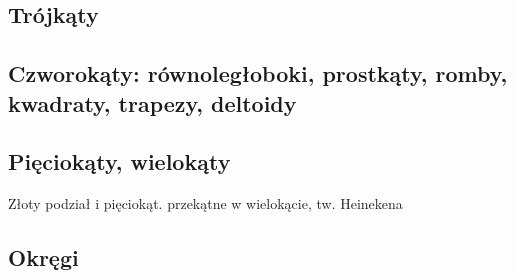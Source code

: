 
\subsection{Trójkąty}


\subsection{Czworokąty: równoległoboki, prostkąty, romby, kwadraty, trapezy, deltoidy}


\subsection{Pięciokąty, wielokąty}
Złoty podział i pięciokąt.
przekątne w wielokącie, tw. Heinekena %

\subsection{Okręgi}




